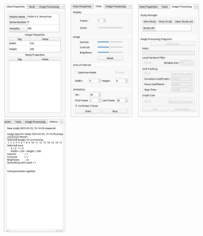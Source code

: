 {\begin {center}
        \centering
        \includegraphics[width=3.5cm, height=6.10cm]{media/existing_app/tabs/view_properties.png}
        \includegraphics[width=3.5cm, height=6.10cm]{media/existing_app/tabs/tools.png}
        \includegraphics[width=3.5cm, height=6.10cm]{media/existing_app/tabs/image_processing_inactive.png}
        \includegraphics[width=3.5cm, height=6.10cm]{media/existing_app/tabs/history.png}
        \captionsetup{justification=centering}
\end {center}

}
